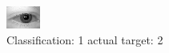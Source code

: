 \begin{figure}[h!]
\begin{center}
\includegraphics[width=0.60\columnwidth]{figures/ID357_class_1_target_2.png}
\end{center}
\caption{ Classification: 1 actual target: 2}
\label{fig:ID357_class_1_target_2}
\end{figure}
